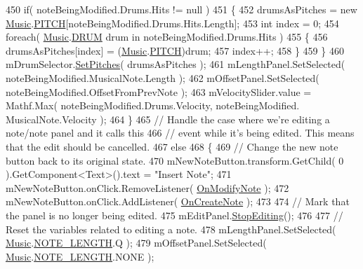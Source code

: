 \begin{DoxyCodeInclude}
450             \textcolor{keywordflow}{if}( noteBeingModified.Drums.Hits != null )
451             \{
452                 drumsAsPitches = \textcolor{keyword}{new} \hyperlink{class_music}{Music}.\hyperlink{group___music_enums_ga508f69b199ea518f935486c990edac1d}{PITCH}[noteBeingModified.Drums.Hits.Length];
453                 \textcolor{keywordtype}{int} index = 0;
454                 \textcolor{keywordflow}{foreach}( \hyperlink{class_music}{Music}.\hyperlink{group___music_enums_gade475b4382c7066d1af13e7c13c029b6}{DRUM} drum in noteBeingModified.Drums.Hits )
455                 \{
456                     drumsAsPitches[index] = (\hyperlink{class_music}{Music}.\hyperlink{group___music_enums_ga508f69b199ea518f935486c990edac1d}{PITCH})drum;
457                     index++;
458                 \}
459             \}
460             mDrumSelector.\hyperlink{group___s_c___p_s_c_pub_func_ga0b85aab924084ebb49be4f64ad6f81e5}{SetPitches}( drumsAsPitches );
461             mLengthPanel.SetSelected( noteBeingModified.MusicalNote.Length );
462             mOffsetPanel.SetSelected( noteBeingModified.OffsetFromPrevNote );
463             mVelocitySlider.value = Mathf.Max( noteBeingModified.Drums.Velocity, noteBeingModified.
      MusicalNote.Velocity );
464         \}
465         \textcolor{comment}{// Handle the case where we're editing a note/note panel and it calls this }
466         \textcolor{comment}{// event while it's being edited. This means that the edit should be cancelled.}
467         \textcolor{keywordflow}{else}
468         \{
469             \textcolor{comment}{// Change the new note button back to its original state.}
470             mNewNoteButton.transform.GetChild( 0 ).GetComponent<Text>().text = \textcolor{stringliteral}{"Insert Note"};
471             mNewNoteButton.onClick.RemoveListener( \hyperlink{group___s_c_m_handlers_gaf12d6326ad2175a51f688504372be784}{OnModifyNote} );
472             mNewNoteButton.onClick.AddListener( \hyperlink{group___s_c_m_handlers_gaed512eb78e060a40616e6e31ce029440}{OnCreateNote} );
473 
474             \textcolor{comment}{// Mark that the panel is no longer being edited.}
475             mEditPanel.\hyperlink{group___s_c___n_d_p_unity_ga92d0f078c4efd6c207173a10e31b5065}{StopEditing}();
476 
477             \textcolor{comment}{// Reset the variables related to editing a note.}
478             mLengthPanel.SetSelected( \hyperlink{class_music}{Music}.\hyperlink{group___music_enums_gaf11b5f079adbb21c800b9eca1c5c3cbd}{NOTE\_LENGTH}.Q );
479             mOffsetPanel.SetSelected( \hyperlink{class_music}{Music}.\hyperlink{group___music_enums_gaf11b5f079adbb21c800b9eca1c5c3cbd}{NOTE\_LENGTH}.NONE );

\end{DoxyCodeInclude}
